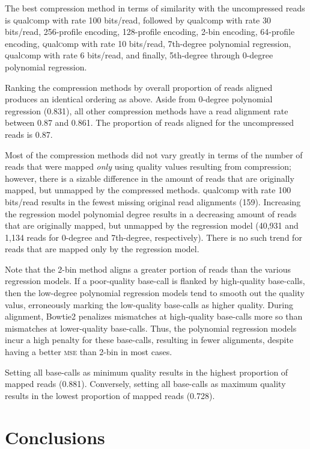 \documentclass[fleqn,10pt,lineno]{wlpeerj} %
\begin{document}
The best compression method in terms of similarity with the
uncompressed reads is \textsc{q}ual\textsc{c}omp with rate 100
bits/read, followed by \textsc{q}ual\textsc{c}omp with rate 30
bits/read, 256-profile encoding, 128-profile encoding, 2-bin encoding,
64-profile encoding, \textsc{q}ual\textsc{c}omp with rate 10
bits/read, 7th-degree polynomial regression,
\textsc{q}ual\textsc{c}omp with rate 6 bits/read, and finally,
5th-degree through 0-degree polynomial regression.

Ranking the compression methods by overall proportion of reads aligned
produces an identical ordering as above. Aside from 0-degree
polynomial regression (0.831), all other compression methods have a
read alignment rate between 0.87 and 0.861. The proportion of reads
aligned for the uncompressed reads is 0.87.

Most of the compression methods did not vary greatly in terms of the
number of reads that were mapped \emph{only} using quality values
resulting from compression; however, there is a sizable difference in
the amount of reads that are originally mapped, but unmapped by the
compressed methods. \textsc{q}ual\textsc{c}omp with rate 100 bits/read
results in the fewest missing original read alignments
(159). Increasing the regression model polynomial degree results in a
decreasing amount of reads that are originally mapped, but unmapped by
the regression model (40,931 and 1,134 reads for 0-degree and
7th-degree, respectively). There is no such trend for reads that are
mapped only by the regression model.

Note that the 2-bin method aligns a greater portion of reads than the
various regression models. If a poor-quality base-call is flanked by
high-quality base-calls, then the low-degree polynomial regression
models tend to smooth out the quality valus, erroneously marking the
low-quality base-calls as higher quality. During alignment, Bowtie2
penalizes mismatches at high-quality base-calls more so than
mismatches at lower-quality base-calls. Thus, the polynomial
regression models incur a high penalty for these base-calls, resulting
in fewer alignments, despite having a better \textsc{mse} than 2-bin
in most cases.

Setting all base-calls as minimum quality results in the highest
proportion of mapped reads (0.881). Conversely, setting all base-calls
as maximum quality results in the lowest proportion of mapped reads
(0.728).

\section*{Conclusions}
\end{document}
